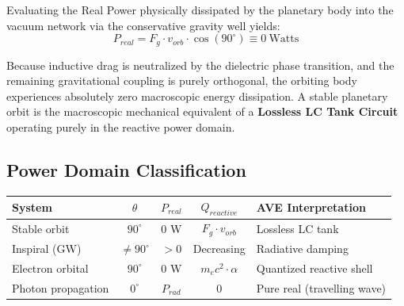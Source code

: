 Evaluating the Real Power physically dissipated by the planetary body into the vacuum
network via the conservative gravity well yields:
\begin{equation}
P_{real} = F_g \cdot v_{orb} \cdot \cos(90^\circ) \equiv 0\ \text{Watts}
\end{equation}

Because inductive drag is neutralized by the dielectric phase transition, and the remaining
gravitational coupling is purely orthogonal, the orbiting body experiences absolutely zero
macroscopic energy dissipation. A stable planetary orbit is the macroscopic mechanical
equivalent of a \textbf{Lossless LC Tank Circuit} operating purely in the reactive power domain.

\subsection*{Power Domain Classification}
\begin{center}
\small
\renewcommand{\arraystretch}{1.2}
\begin{tabular}{lcccl}
\toprule
\textbf{System} & \textbf{$\theta$} & \textbf{$P_{real}$} & \textbf{$Q_{reactive}$} & \textbf{AVE Interpretation} \\
\midrule
Stable orbit     & $90^\circ$ & $0$ W & $F_g \cdot v_{orb}$ & Lossless LC tank \\
Inspiral (GW)    & $\neq 90^\circ$ & $> 0$ & Decreasing & Radiative damping \\
Electron orbital & $90^\circ$ & $0$ W & $m_e c^2 \cdot \alpha$ & Quantized reactive shell \\
Photon propagation & $0^\circ$ & $P_{rad}$ & $0$ & Pure real (travelling wave) \\
\bottomrule
\end{tabular}
\end{center}